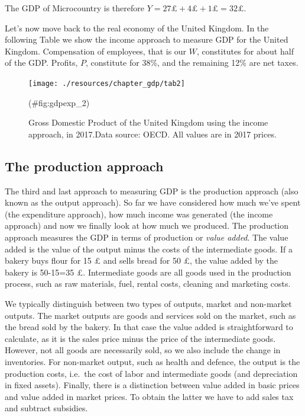 \documentclass[
]{book}
\begin{document}
The GDP of Microcountry is therefore \(Y=27£+4£+1£=32£\).

Let's now move back to the real economy of the United Kingdom. In the following Table we show the income approach to measure GDP for the United Kingdom. Compensation of employees, that is our \(W\), constitutes for about half of the GDP. Profits, \(P\), constitute for 38\%, and the remaining 12\% are net taxes.

\begin{figure}

{\centering \texttt{[image: ./resources/chapter\_gdp/tab2]} 

}

\caption{Gross Domestic Product of the United Kingdom using the income approach, in 2017.Data source: OECD. All values are in 2017 prices.}(\#fig:gdpexp_2)
\end{figure}

\hypertarget{the-production-approach}{%
\subsection*{The production approach}\label{the-production-approach}}

The third and last approach to measuring GDP is the production approach (also known as the output approach). So far we have considered how much we've spent (the expenditure approach), how much income was generated (the income approach) and now we finally look at how much we produced. The production approach measures the GDP in terms of production or \emph{value added}. The value added is the value of the output minus the costs of the intermediate goods. If a bakery buys flour for 15 £ and sells bread for 50 £, the value added by the bakery is 50-15=35 £. Intermediate goods are all goods used in the production process, such as raw materials, fuel, rental costs, cleaning and marketing costs.

We typically distinguish between two types of outputs, market and non-market outputs. The market outputs are goods and services sold on the market, such as the bread sold by the bakery. In that case the value added is straightforward to calculate, as it is the sales price minus the price of the intermediate goods. However, not all goods are necessarily sold, so we also include the change in inventories. For non-market output, such as health and defence, the output is the production costs, i.e.~the cost of labor and intermediate goods (and depreciation in fixed assets). Finally, there is a distinction between value added in basic prices and value added in market prices. To obtain the latter we have to add sales tax and subtract subsidies.
\end{document}
